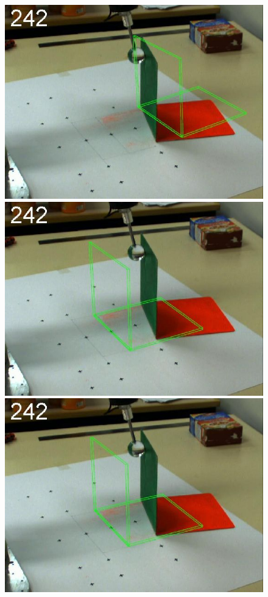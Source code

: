 \begin{figure}[tb]
{\includegraphics[width=\imgBXwid]{images/B2_2exp_58_4}
\includegraphics[width=\imgBXwid]{images/B2_1exp_58_4}
\includegraphics[width=\imgBXwid]{images/B2_LWPR1_58_4}
}
\end{figure}
